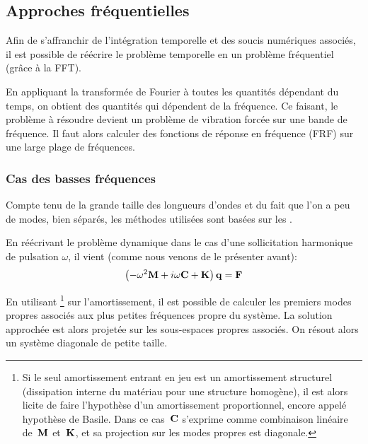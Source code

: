 \medskip
\subsection{Approches fréquentielles}

Afin de s'affranchir de l'intégration temporelle et des soucis numériques associés, il est possible de réécrire le problème temporelle en un problème fréquentiel (grâce à la FFT).


\medskip
En appliquant la transformée de Fourier à toutes les quantités dépendant du temps, on obtient des quantités qui dépendent de la fréquence. Ce faisant, le problème à résoudre devient un problème de vibration forcée sur une bande de fréquence. Il faut alors calculer des fonctions de réponse en fréquence (FRF) sur une large plage de fréquences.

\medskip
\subsubsection{Cas des basses fréquences}

Compte tenu de la grande taille des longueurs d'ondes et du fait que l'on a peu de modes, bien séparés, les méthodes utilisées sont basées sur les .

En réécrivant le problème dynamique dans le cas d'une sollicitation harmonique de pulsation $\omega$, il vient (comme nous venons de le présenter avant):
\begin{equation}
\left(-\omega^2\MM{M}+i\omega \MM{C}+\MM{K}\right)\VV{q} = \VV{F}
\end{equation}

En utilisant \footnote{%
Si le seul amortissement entrant en jeu est un amortissement structurel (dissipation
interne du matériau pour une structure homogène), il est alors licite de faire
l'hypothèse d'un amortissement proportionnel, encore appelé hypothèse de
Basile. Dans ce cas~$\MM{C}$ s'exprime comme combinaison linéaire de~$\MM{M}$ et~$\MM{K}$,
et sa projection sur les modes propres est diagonale.
} sur l'amortissement, il est possible de calculer les premiers modes propres associés aux plus petites fréquences propre du système. La solution approchée est alors projetée sur les sous-espaces propres associés. On résout alors un système diagonale de petite taille.


